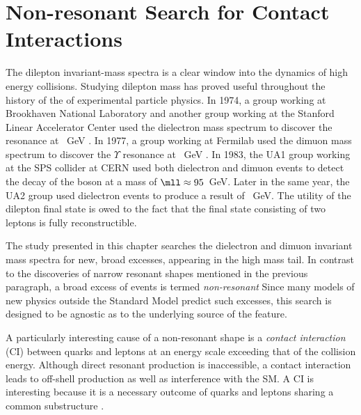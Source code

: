 \chapter{Non-resonant Search for Contact Interactions}\label{sec:ci}

The dilepton invariant-mass spectra is a clear window into the dynamics of high energy collisions.
Studying dilepton mass has proved useful throughout the history of the of experimental particle physics.
In 1974, a group working at Brookhaven National Laboratory and another group working at the Stanford Linear Accelerator Center used the dielectron mass spectrum to discover the \jpsi resonance at ~GeV \cite{jpsiBnl}\cite{jpsiSlac}.
In 1977, a group working at Fermilab used the dimuon mass spectrum to discover the $\Upsilon$ resonance at ~GeV \cite{upsilon}.
In 1983, the UA1 group working at the SPS collider at CERN used both dielectron and dimuon events to detect the decay of the \Z boson at a mass of $\mll\approx95$~GeV\cite{z0ua1}.
Later in the same year, the UA2 group used dielectron events to produce a result of ~GeV.
The utility of the dilepton final state is owed to the fact that the final state consisting of two leptons is fully reconstructible.

The study presented in this chapter searches the dielectron and dimuon invariant mass spectra for new, broad excesses, appearing in the high mass tail.
In contrast to the discoveries of narrow resonant shapes mentioned in the previous paragraph, a broad excess of events is termed \emph{non-resonant}
Since many models of new physics outside the Standard Model predict such excesses, this search is designed to be agnostic as to the underlying source of the feature.

A particularly interesting cause of a non-resonant shape is a \emph{contact interaction} (CI) between quarks and leptons at an energy scale exceeding that of the collision energy.
Although direct resonant production is inaccessible, a contact interaction leads to off-shell production as well as interference with the SM.
A \qqll CI is interesting because it is a necessary outcome of quarks and leptons sharing a common substructure \cite{eichten}.

